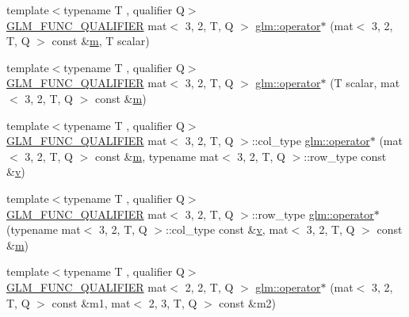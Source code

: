 \begin{DoxyCompactItemize}
\item 
{\footnotesize template$<$typename T , qualifier Q$>$ }\\\mbox{\hyperlink{setup_8hpp_a33fdea6f91c5f834105f7415e2a64407}{G\+L\+M\+\_\+\+F\+U\+N\+C\+\_\+\+Q\+U\+A\+L\+I\+F\+I\+ER}} mat$<$ 3, 2, T, Q $>$ \mbox{\hyperlink{namespaceglm_a7cc820630c7977b58edacb1445979aaf}{glm\+::operator$\ast$}} (mat$<$ 3, 2, T, Q $>$ const \&\mbox{\hyperlink{_s_d_l__opengl__glext_8h_af593500c283bf1a787a6f947f503a5c2}{m}}, T scalar)
\item 
{\footnotesize template$<$typename T , qualifier Q$>$ }\\\mbox{\hyperlink{setup_8hpp_a33fdea6f91c5f834105f7415e2a64407}{G\+L\+M\+\_\+\+F\+U\+N\+C\+\_\+\+Q\+U\+A\+L\+I\+F\+I\+ER}} mat$<$ 3, 2, T, Q $>$ \mbox{\hyperlink{namespaceglm_af0e8aff249431ecfc857868c5a4d7035}{glm\+::operator$\ast$}} (T scalar, mat$<$ 3, 2, T, Q $>$ const \&\mbox{\hyperlink{_s_d_l__opengl__glext_8h_af593500c283bf1a787a6f947f503a5c2}{m}})
\item 
{\footnotesize template$<$typename T , qualifier Q$>$ }\\\mbox{\hyperlink{setup_8hpp_a33fdea6f91c5f834105f7415e2a64407}{G\+L\+M\+\_\+\+F\+U\+N\+C\+\_\+\+Q\+U\+A\+L\+I\+F\+I\+ER}} mat$<$ 3, 2, T, Q $>$\+::col\+\_\+type \mbox{\hyperlink{namespaceglm_a2c7e7d65d33a6767060defe03c59c606}{glm\+::operator$\ast$}} (mat$<$ 3, 2, T, Q $>$ const \&\mbox{\hyperlink{_s_d_l__opengl__glext_8h_af593500c283bf1a787a6f947f503a5c2}{m}}, typename mat$<$ 3, 2, T, Q $>$\+::row\+\_\+type const \&\mbox{\hyperlink{_s_d_l__opengl_8h_a10a82eabcb59d2fcd74acee063775f90}{v}})
\item 
{\footnotesize template$<$typename T , qualifier Q$>$ }\\\mbox{\hyperlink{setup_8hpp_a33fdea6f91c5f834105f7415e2a64407}{G\+L\+M\+\_\+\+F\+U\+N\+C\+\_\+\+Q\+U\+A\+L\+I\+F\+I\+ER}} mat$<$ 3, 2, T, Q $>$\+::row\+\_\+type \mbox{\hyperlink{namespaceglm_a5ed2536927f15d0188a061a89a2aafb3}{glm\+::operator$\ast$}} (typename mat$<$ 3, 2, T, Q $>$\+::col\+\_\+type const \&\mbox{\hyperlink{_s_d_l__opengl_8h_a10a82eabcb59d2fcd74acee063775f90}{v}}, mat$<$ 3, 2, T, Q $>$ const \&\mbox{\hyperlink{_s_d_l__opengl__glext_8h_af593500c283bf1a787a6f947f503a5c2}{m}})
\item 
{\footnotesize template$<$typename T , qualifier Q$>$ }\\\mbox{\hyperlink{setup_8hpp_a33fdea6f91c5f834105f7415e2a64407}{G\+L\+M\+\_\+\+F\+U\+N\+C\+\_\+\+Q\+U\+A\+L\+I\+F\+I\+ER}} mat$<$ 2, 2, T, Q $>$ \mbox{\hyperlink{namespaceglm_a027c17cbc40f738d26c9c9897a537344}{glm\+::operator$\ast$}} (mat$<$ 3, 2, T, Q $>$ const \&m1, mat$<$ 2, 3, T, Q $>$ const \&m2)

\end{DoxyCompactItemize}
